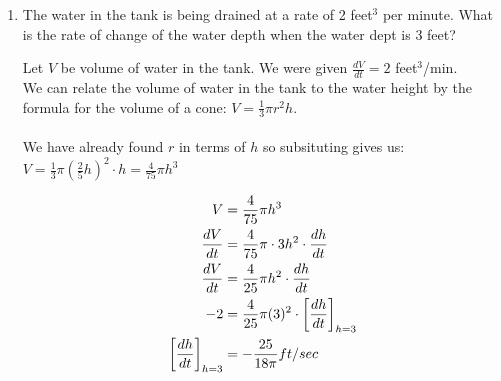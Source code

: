 \documentclass[nooutcomes,handout]{ximera}
\begin{document}
\begin{problem}
\begin{enumerate}
	\item The water in the tank is being drained at a rate of 2 feet$^3$ per minute.  What is the rate of change of the water depth when the water dept is 3 feet?

	\begin{freeResponse}
	Let $V$ be volume of water in the tank.  We were given $\frac{dV}{dt}=2$ feet$^3$/min. \\
	We can relate the volume of water in the tank to the water height by the formula for the volume of a cone: $V=\frac{1}{3}\pi r^2 h$. \\\\
	We have already found $r$ in terms of $h$ so subsituting gives us:  $V=\frac{1}{3}\pi \left(\frac{2}{5}h\right)^2\cdot h=\frac{4}{75}\pi h^3$
	
	\begin{align*}
	V&=\frac{4}{75}\pi h^3\\
	\frac{dV}{dt}&=\frac{4}{75}\pi \cdot 3h^2 \cdot \frac{dh}{dt} \\
	\frac{dV}{dt}&=\frac{4}{25}\pi h^2 \cdot \frac{dh}{dt} \\
	-2&=\frac{4}{25}\pi (3)^2 \cdot \bigg[ \frac{dh}{dt} \bigg]_{h=3} \\
	\bigg[ \frac{dh}{dt} \bigg]_{h=3}&=-\frac{25}{18 \pi} ft/sec
	\end{align*}


\end{freeResponse}
\end{enumerate}
\end{problem}
\end{document}
